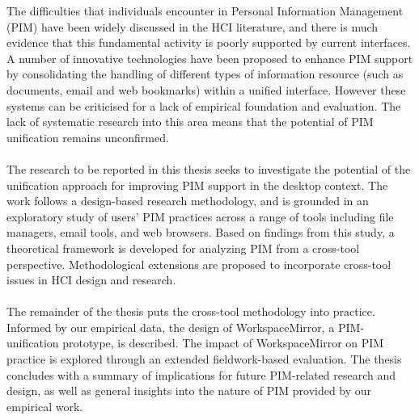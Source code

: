 The difficulties that individuals encounter in Personal Information Management (PIM) have been widely discussed in the HCI literature, and there is much evidence that this fundamental activity is poorly supported by current interfaces. A number of innovative technologies have been proposed to enhance PIM support by consolidating the handling of different types of information resource (such as documents, email and web bookmarks) within a unified interface.  However these systems can be criticised for a lack of empirical foundation and evaluation. The lack of systematic research into this area means that the potential of PIM unification remains unconfirmed.
\\
\\
The research to be reported in this thesis seeks to investigate the potential of the unification approach for improving PIM support in the desktop context.  The work follows a design-based research methodology, and is grounded in an exploratory study of users' PIM practices across a range of tools including file managers, email tools, and web browsers.  Based on findings from this study, a theoretical framework is developed for analyzing PIM from a cross-tool perspective.  Methodological extensions are proposed to incorporate cross-tool issues in HCI design and research.
\\
\\
The remainder of the thesis puts the cross-tool methodology into practice. Informed by our empirical data, the design of WorkspaceMirror, a PIM-unification prototype, is described. The impact of WorkspaceMirror on PIM practice is explored through an extended fieldwork-based evaluation. The thesis concludes with a summary of implications for future PIM-related research and design, as well as general insights into the nature of PIM provided by our empirical work.





